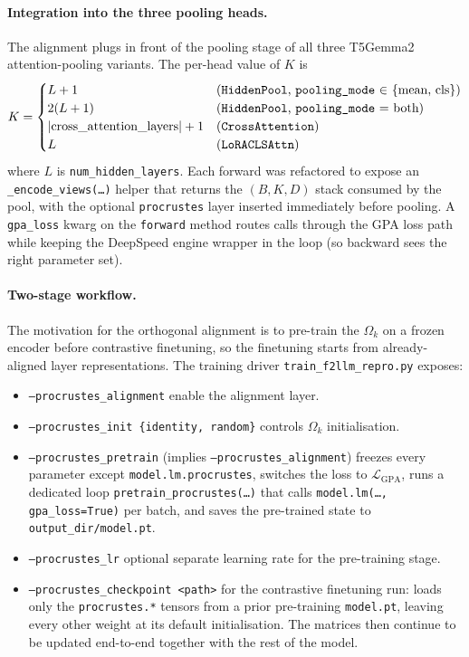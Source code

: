 \documentclass{article}
\begin{document}
\paragraph{Integration into the three pooling heads.}
The alignment plugs in front of the pooling stage of all three T5Gemma2
attention-pooling variants. The per-head value of $K$ is
\[
  K =
  \begin{cases}
    L+1 & \text{(\texttt{HiddenPool}, \texttt{pooling\_mode} $\in$ \{mean, cls\})}\\
    2(L+1) & \text{(\texttt{HiddenPool}, \texttt{pooling\_mode} = both)}\\
    \lvert\text{cross\_attention\_layers}\rvert + 1 & \text{(\texttt{CrossAttention})}\\
    L & \text{(\texttt{LoRACLSAttn})}
  \end{cases}
\]
where $L$ is \texttt{num\_hidden\_layers}. Each forward was refactored
to expose an \texttt{\_encode\_views(\dots)} helper that returns the
$(B,K,D)$ stack consumed by the pool, with the optional
\texttt{procrustes} layer inserted immediately before pooling. A
\texttt{gpa\_loss} kwarg on the \texttt{forward} method routes calls
through the GPA loss path while keeping the DeepSpeed engine wrapper
in the loop (so backward sees the right parameter set).

\paragraph{Two-stage workflow.}
The motivation for the orthogonal alignment is to pre-train the
$\Omega_k$ on a frozen encoder before contrastive finetuning, so the
finetuning starts from already-aligned layer representations. The
training driver \texttt{train\_f2llm\_repro.py} exposes:

\begin{itemize}
  \item \texttt{--procrustes\_alignment} enable the alignment layer.
  \item \texttt{--procrustes\_init \{identity, random\}} controls
        $\Omega_k$ initialisation.
  \item \texttt{--procrustes\_pretrain} (implies
        \texttt{--procrustes\_alignment}) freezes every parameter
        except \texttt{model.lm.procrustes}, switches the loss to
        $\mathcal{L}_{\text{GPA}}$, runs a dedicated loop
        \texttt{pretrain\_procrustes(\dots)} that calls
        \texttt{model.lm(\dots, gpa\_loss=True)} per batch, and saves
        the pre-trained state to \texttt{output\_dir/model.pt}.
  \item \texttt{--procrustes\_lr} optional separate learning rate
        for the pre-training stage.
  \item \texttt{--procrustes\_checkpoint <path>} for the
        contrastive finetuning run: loads only the
        \texttt{procrustes.*} tensors from a prior pre-training
        \texttt{model.pt}, leaving every other weight at its default
        initialisation. The matrices then continue to be updated
        end-to-end together with the rest of the model.
\end{itemize}
\end{document}
